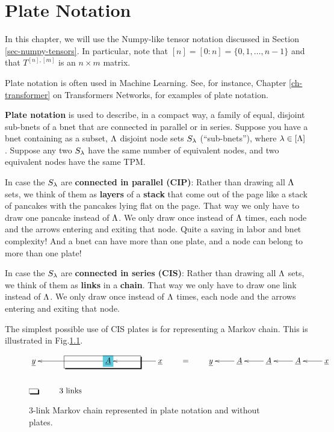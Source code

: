 \chapter{Plate Notation}
\label{ch-plates}

In this chapter, we
will use the Numpy-like tensor notation
discussed in Section 
\ref{sec-numpy-tensors}. In particular, note that $[n] = [0:n] = \{0, 1,\ldots, n-1\}$ and that $T^{[n], [m]}$ is an $n\times m$ matrix.

Plate notation is often used in Machine Learning. See, for instance,
Chapter \ref{ch-transformer} on Transformers Networks, for  examples of plate notation.


{\bf Plate notation} is used to describe, in a compact way, a family of 
equal, disjoint  sub-bnets of a bnet that are connected in parallel or in series.
Suppose you have a bnet containing as a subset, $\Lambda$ disjoint node sets
$S_\lambda$ (\enquote{sub-bnets}), where
$\lambda\in [\Lambda]$. Suppose
any two $S_\lambda$ have the same number of equivalent nodes,
and two equivalent nodes have the same TPM.

In case the $S_\lambda$ are {\bf connected in parallel (CIP)}:
Rather than drawing all $\Lambda$ sets, 
we think of them as {\bf layers} of a {\bf stack}
that come out of the page like a stack of pancakes with the pancakes
lying flat on the page.
That way we only have to draw one pancake instead of $\Lambda$.
We only draw once instead of $\Lambda$ times, each node and the arrows entering and exiting
that node. Quite a saving in labor and bnet complexity! 
And a bnet can have more 
than one plate, and a node can belong
to more than one plate!

In case the $S_\lambda$ are {\bf connected in series (CIS)}: Rather than drawing all $\Lambda$ sets, 
we think of them as {\bf links} in a {\bf chain}.
That way we only have to draw one link instead of $\Lambda$.
We only draw once instead of $\Lambda$ times, each node and the arrows entering and exiting
that node. 


The simplest possible use
of CIS plates is for representing
a Markov chain. This is
illustrated in  Fig.\ref{fig-texnn-for-markov}.
\begin{figure}[h!]\centering
$$\xymatrix{
{\underline{y}}&&*+[F*:SkyBlue]{\underline{A}}\ar[ll]&&{\underline{x}}\ar[ll]
\save
\POS"1,2"."1,2"."1,4"."1,4"!C*+<1.0em>\frm{-,}
\restore
\\
*+[F-,]{\;\;}&\text{3 links}
} \quad\quad=\quad\quad \xymatrix{\rvy & \rvA\ar[l] &\rvA\ar[l] &\rvA\ar[l] & \rvx\ar[l]}$$
\caption{3-link Markov chain represented in plate notation
and without plates.}
\label{fig-texnn-for-markov}
\end{figure}


